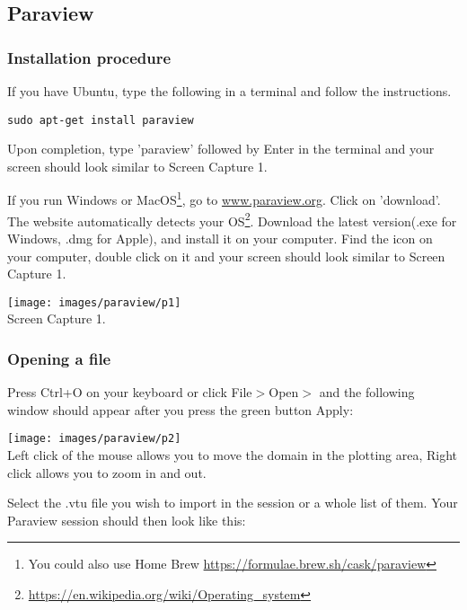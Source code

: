 \subsection{Paraview \label{app:paraview}}

\subsubsection*{Installation procedure}

If you have Ubuntu, type the following in a terminal and follow the instructions. 
\begin{verbatim}
sudo apt-get install paraview
\end{verbatim}
Upon completion, type 'paraview' followed by Enter in the terminal and your screen should look similar to Screen Capture 1.

If you run Windows or MacOS\footnote{You could also use Home Brew 
\url{https://formulae.brew.sh/cask/paraview}}, go to \url{www.paraview.org}. 
Click on 'download'. The website automatically detects your 
OS\footnote{\url{https://en.wikipedia.org/wiki/Operating_system}}. 
Download the latest version(.exe for Windows, .dmg for Apple), and install it on your computer. 
Find the icon on your computer, double click on it and your screen should look similar to Screen Capture 1.

\begin{center}
\texttt{[image: images/paraview/p1]}\\
{\captionfont Screen Capture 1.}
\end{center}

\subsubsection*{Opening a file}

Press Ctrl+O on your keyboard or click File$>$Open$>$ and the following window should appear after you press the 
green button Apply:

\begin{center}
\texttt{[image: images/paraview/p2]}\\
{\captionfont Left click of the mouse allows you to move the domain in the plotting area, 
Right click allows you to zoom in and out.}
\end{center}

Select the .vtu file you wish to import in the session or a whole list of them. 
Your Paraview session should then look like this:
 
